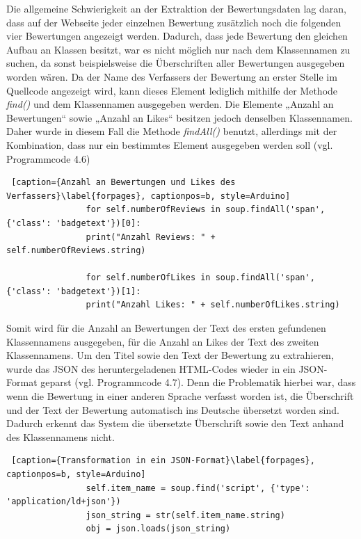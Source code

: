 \documentclass[a4paper,oneside,12pt]{report}
\begin{document}
				Die allgemeine Schwierigkeit an der Extraktion der Bewertungsdaten lag daran, dass auf der Webseite jeder einzelnen Bewertung zusätzlich noch die folgenden vier Bewertungen angezeigt werden. Dadurch, dass jede Bewertung den gleichen Aufbau an Klassen besitzt, war es nicht möglich nur nach dem Klassennamen zu suchen, da sonst beispielsweise die Überschriften aller Bewertungen ausgegeben worden wären. 
				Da der Name des Verfassers der Bewertung an erster Stelle im Quellcode angezeigt wird, kann dieses Element lediglich mithilfe der Methode 	\textit{find()} und dem Klassennamen ausgegeben werden. 
				Die Elemente „Anzahl an Bewertungen“ sowie „Anzahl an Likes“ besitzen jedoch denselben Klassennamen. Daher wurde in diesem Fall die Methode \textit{findAll()} benutzt, allerdings mit der Kombination, dass nur ein bestimmtes Element ausgegeben werden soll (vgl. Programmcode 4.6)
				\newpage
				\begin{lstlisting} [caption={Anzahl an Bewertungen und Likes des Verfassers}\label{forpages}, captionpos=b, style=Arduino]
				for self.numberOfReviews in soup.findAll('span', {'class': 'badgetext'})[0]:
				print("Anzahl Reviews: " + self.numberOfReviews.string)
				
				for self.numberOfLikes in soup.findAll('span', {'class': 'badgetext'})[1]:
				print("Anzahl Likes: " + self.numberOfLikes.string)
				\end{lstlisting}
				
				Somit wird für die Anzahl an Bewertungen der Text des ersten gefundenen Klassennamens ausgegeben, für die Anzahl an Likes der Text des zweiten Klassennamens. 
				Um den Titel sowie den Text der Bewertung zu extrahieren, wurde das JSON des heruntergeladenen HTML-Codes wieder in ein JSON-Format geparst (vgl. Programmcode 4.7). Denn die Problematik hierbei war, dass wenn die Bewertung in einer anderen Sprache verfasst worden ist, die Überschrift und der Text der Bewertung automatisch ins Deutsche übersetzt worden sind. Dadurch erkennt das System die übersetzte Überschrift sowie den Text anhand des Klassennamens nicht.
				\\
				\begin{lstlisting} [caption={Transformation in ein JSON-Format}\label{forpages}, captionpos=b, style=Arduino]
				self.item_name = soup.find('script', {'type': 'application/ld+json'})
				json_string = str(self.item_name.string)
				obj = json.loads(json_string)
				\end{lstlisting}
				
\end{document}
